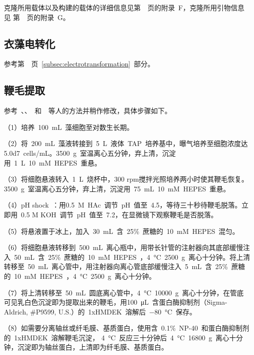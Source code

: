 克隆所用载体以及构建的载体的详细信息见第\ \pageref{appen:F}\ 页的附录\ F，克隆所用引物信息见
第\ \pageref{appen:G}\ 页的附录\ G。

\subsection{衣藻电转化}
参考第\ \pageref{subsec:electrotransformation}\ 页\ \ref{subsec:electrotransformation}\ 部分。

\subsection{鞭毛提取}\label{subsec:flagella}
参考\ \citet{Behal2013}、\citet{Cole1998}、\citet{Richey2013}\ 和\ \citet{Witman1972}\ 等人的方法并稍作修改，具体步骤如下。

（1）培养\ \SI{100}{\mL}\ 藻细胞至对数生长期。

（2）将\ \SI{200}{\mL}\ 藻液转接到\ \SI{5}{\L}\ 液体\ TAP\ 培养基中，曝气培养至细胞浓度达
\num{5.0d7}\ cells/mL。\SI{3500}{\g}\ 室温离心五分钟，弃上清，沉淀用\ \SI{1}{\L}\ \SI{10}{\milli\nauticalmile}\ HEPES\ 重悬。

（3）将细胞悬液转入\ \SI{1}{\L}\ 烧杯中，300 rpm搅拌光照培养两小时使其鞭毛恢复。\SI{3500}{\g}\ 室温离心五分钟，弃上清，沉淀用\ \SI{75}{\mL}\ \SI{10}{\milli\nauticalmile}\ HEPES\ 重悬。

（4）pH shock\ \citep{Lefebvre1995,Hunter2016}：用\SI{0.5}{\nauticalmile}\ HAc\ 调节\ pH\ 值至\ 4.5，等待三十秒待鞭毛脱落。立即用\ 0.5 M KOH\ 调节\ pH\ 值至\ 7.2，在显微镜下观察鞭毛是否脱落。

（5）将悬液置于冰上，加入\ \SI{30}{\mL}\ 含\ 25\%\ 蔗糖的\ \SI{10}{\milli\nauticalmile}\ HEPES\ 混匀。

（6）将细胞悬液转移到\ \SI{500}{\mL}\ 离心瓶中，用带长针管的注射器向其底部缓慢注入\ \SI{50}{\mL}\ 含\ 25\%\ 蔗糖的\ \SI{10}{\milli\nauticalmile}\ HEPES\ ，\SI{4}{\degreeCelsius}\ \SI{2500}{\g}\ 离心十分钟。将上清转移至\ \SI{50}{\mL}\ 离心管中，用注射器向离心管底部缓慢注入\ \SI{5}{\mL}\ 含\ 25\%\ 蔗糖的\ \SI{10}{\milli\nauticalmile}\ HEPES\ ，\SI{4}{\degreeCelsius}\ \SI{2500}{\g}\ 离心十分钟。

（7）将上清转移至\ \SI{50}{\mL}\ 圆底离心管中，\SI{4}{\degreeCelsius}\ \SI{10000}{\g}\ 离心十分钟，在管底可见乳白色沉淀即为提取出来的鞭毛，用\SI{100}{\uL}\ 含蛋白酶抑制剂（Sigma-Aldrich, \#P9599, U.S.）的\ 1xHMDEK\ 溶解后\ \SI{-80}{\degreeCelsius}\ 保存。

（8）如需要分离轴丝或纤毛膜、基质蛋白，使用含\ 0.1\%\ NP-40\ 和蛋白酶抑制剂的\ 1xHMDEK\ 溶解鞭毛沉淀，
\SI{4}{\degreeCelsius}\ 反应三十分钟后\ \SI{4}{\degreeCelsius}\ \SI{16800}{\g}\ 离心十分钟，沉淀即为轴丝蛋白，上清即为纤毛膜、基质蛋白。


